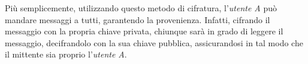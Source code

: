 Più semplicemente, utilizzando questo metodo di cifratura, l'\emph{utente A} può mandare messaggi a tutti, garantendo la provenienza. Infatti, cifrando il messaggio con la propria chiave privata, chiunque sarà in grado di leggere il messaggio, decifrandolo con la sua chiave pubblica, assicurandosi in tal modo che il mittente sia proprio l'\emph{utente A}.
































